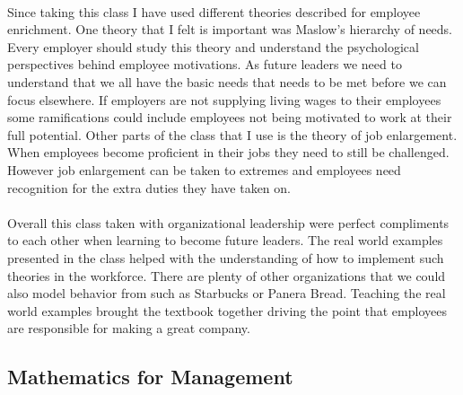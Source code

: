 \documentclass[12pt,titlepage]{article}
\begin{document}
\paragraph {}
Since taking this class I have used different theories described for employee enrichment. One theory that I felt is important was Maslow's hierarchy of needs. Every employer should study this theory and understand the psychological perspectives behind employee motivations. As future leaders we need to understand that we all have the basic needs that needs to be met before we can focus elsewhere. If employers are not supplying living wages to their employees some ramifications could include employees not being motivated to work at their full potential. Other parts of the class that I use is the theory of job enlargement. When employees become proficient in their jobs they need to still be challenged. However job enlargement can be taken to extremes and employees need recognition for the extra duties they have taken on.
\paragraph {}
Overall this class taken with organizational leadership were perfect compliments to each other when learning to become future leaders. The real world examples presented in the class helped with the understanding of how to implement such theories in the workforce. There are plenty of other organizations that we could also model behavior from such as Starbucks or Panera Bread. Teaching the real world examples brought the textbook together driving the point that employees are responsible for making a great company.


\restoregeometry





\subsection{Mathematics for Management}
\end{document}
